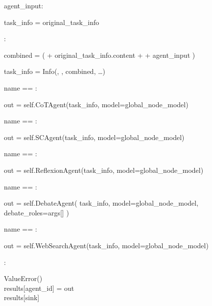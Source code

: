 \begin{subagent}[title=High DoM Parser]
\quad\quad {}

\quad\quad {}  agent\_input:

\quad\quad\quad task\_info = original\_task\_info

\quad\quad {}:

\quad\quad\quad combined = (
 + original\_task\_info.content +  + agent\_input
)

\quad\quad\quad task\_info = Info(, , combined, \dots) \\

\quad\quad {}

\quad\quad {} name == :

\quad\quad\quad out =  self.CoTAgent(task\_info, model=global\_node\_model)

\quad\quad {} name == :

\quad\quad\quad out =  self.SCAgent(task\_info, model=global\_node\_model)

\quad\quad {} name == :

\quad\quad\quad out =  self.ReflexionAgent(task\_info, model=global\_node\_model)

\quad\quad {} name == :

\quad\quad\quad out =  self.DebateAgent(
task\_info,
model=global\_node\_model,
debate\_roles=args[]
)

\quad\quad {} name == :

\quad\quad\quad out =  self.WebSearchAgent(task\_info, model=global\_node\_model)

\quad\quad {}:

\quad\quad\quad {} ValueError() \\

\quad\quad results[agent\_id] = out \\

\quad {} results[sink] \\



\end{subagent}
